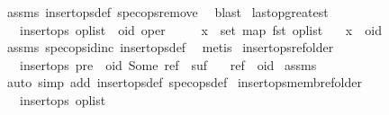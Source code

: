 \begin{isabellebody}
%
\isadelimproof
%
\endisadelimproof
%
\isatagproof
{}\isamarkupfalse%
\ assms\ insert{\isacharunderscore}ops{\isacharunderscore}def\ spec{\isacharunderscore}ops{\isacharunderscore}remove{}\ \isamarkupfalse%
\ blast%
\endisatagproof
{\isafoldproof}%
%
\isadelimproof
\isanewline
%
\endisadelimproof
\isanewline
{}\isamarkupfalse%
\ last{\isacharunderscore}op{\isacharunderscore}greatest{\isacharcolon}\isanewline
\ \ \ {\isachardoublequoteopen}insert{\isacharunderscore}ops\ {\isacharparenleft}op{\isacharunderscore}list\ {\isacharat}\ {\isacharbrackleft}{\isacharparenleft}oid{\isacharcomma}\ oper{\isacharparenright}{\isacharbrackright}{\isacharparenright}{\isachardoublequoteclose}\isanewline
\ \ \ \ \ {\isachardoublequoteopen}x\ {\isasymin}\ set\ {\isacharparenleft}map\ fst\ op{\isacharunderscore}list{\isacharparenright}{\isachardoublequoteclose}\isanewline
\ \ \ {\isachardoublequoteopen}x\ {\isacharless}\ oid{\isachardoublequoteclose}\isanewline
%
\isadelimproof
%
\endisadelimproof
%
\isatagproof
{}\isamarkupfalse%
\ assms\ spec{\isacharunderscore}ops{\isacharunderscore}id{\isacharunderscore}inc\ insert{\isacharunderscore}ops{\isacharunderscore}def\ \isamarkupfalse%
\ metis%
\endisatagproof
{\isafoldproof}%
%
\isadelimproof
\isanewline
%
\endisadelimproof
\isanewline
{}\isamarkupfalse%
\ insert{\isacharunderscore}ops{\isacharunderscore}ref{\isacharunderscore}older{\isacharcolon}\isanewline
\ \ \ {\isachardoublequoteopen}insert{\isacharunderscore}ops\ {\isacharparenleft}pre\ {\isacharat}\ {\isacharbrackleft}{\isacharparenleft}oid{\isacharcomma}\ Some\ ref{\isacharparenright}{\isacharbrackright}\ {\isacharat}\ suf{\isacharparenright}{\isachardoublequoteclose}\isanewline
\ \ \ {\isachardoublequoteopen}ref\ {\isacharless}\ oid{\isachardoublequoteclose}\isanewline
%
\isadelimproof
%
\endisadelimproof
%
\isatagproof
{}\isamarkupfalse%
\ assms\ \isamarkupfalse%
\ {\isacharparenleft}auto\ simp\ add{\isacharcolon}\ insert{\isacharunderscore}ops{\isacharunderscore}def\ spec{\isacharunderscore}ops{\isacharunderscore}def{\isacharparenright}%
\endisatagproof
{\isafoldproof}%
%
\isadelimproof
\isanewline
%
\endisadelimproof
\isanewline
{}\isamarkupfalse%
\ insert{\isacharunderscore}ops{\isacharunderscore}memb{\isacharunderscore}ref{\isacharunderscore}older{\isacharcolon}\isanewline
\ \ \ {\isachardoublequoteopen}insert{\isacharunderscore}ops\ op{\isacharunderscore}list{\isachardoublequoteclose}\isanewline

\end{isabellebody}

